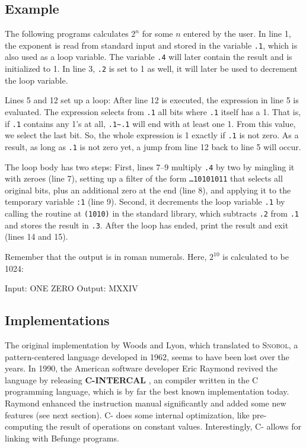 \subsection{Example}

The following programs calculates $2^n$ for some $n$ entered by the user. In line 1, the exponent is read from standard input and stored in the variable \texttt{.1}, which is also used as a loop variable. The variable \texttt{.4} will later contain the result and is initialized to 1. In line 3, \texttt{.2} is set to 1 as well, it will later be used to decrement the loop variable.

Lines 5 and 12 set up a loop: After line 12 is executed, the expression in line 5 is evaluated. The expression selects from \texttt{.1} all bits where \texttt{.1} itself has a 1. That is, if \texttt{.1} contains any 1's at all, \texttt{.1\~{}.1} will end with at least one 1. From this value, we select the last bit. So, the whole expression is 1 exactly if \texttt{.1} is not zero. As a result, as long as \texttt{.1} is not zero yet, a jump from line 12 back to line 5 will occur.

The loop body has two steps: First, lines 7--9 multiply \texttt{.4} by two by mingling it with zeroes (line 7), setting up a filter of the form \texttt{\dots10101011} that selects all original bits, plus an additional zero at the end (line 8), and applying it to the temporary variable \texttt{:1} (line 9). Second, it decrements the loop variable \texttt{.1} by calling the routine at \texttt{(1010)} in the standard library, which subtracts \texttt{.2} from \texttt{.1} and stores the result in \texttt{.3}.
After the loop has ended, print the result and exit (lines 14 and 15).



Remember that the output is in roman numerals. Here, $2^{10}$ is calculated to be 1024:

\begin{io}
Input: ONE ZERO
Output: MXXIV
\end{io}

\subsection{Implementations}

The original implementation by Woods and Lyon, which translated \ic{} to \textsc{Snobol}, a pattern-centered language developed in 1962, seems to have been lost over the years. In 1990, the American software developer Eric Raymond revived the language by releasing \textbf{C-INTERCAL} \cite{raymond_intercal}, an \ic{} compiler written in the C programming language, which is by far the best known implementation today. Raymond enhanced the instruction manual \cite{raymond2010cintercal} significantly and added some new features (see next section). C-\ic{} does some internal optimization, like pre-computing the result of operations on constant values. Interestingly, C-\ic{} allows for linking with Befunge programs.

